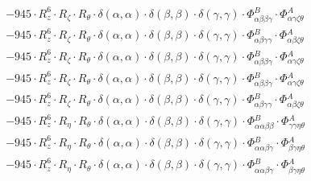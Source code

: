 \documentclass{article}
\begin{document}
\begin{subequations}
\begin{gather}
\begin{array}{c}
 \\[0.2em] 		 - 945 \cdot R_{z}^{6} \cdot R_{\zeta{}} \cdot R_{\theta{}} \cdot \delta{}\left(\alpha{}, \alpha{}\right) \cdot \delta{}\left(\beta{}, \beta{}\right) \cdot \delta{}\left(\gamma{}, \gamma{}\right) \cdot \Phi{}^{B}_{\alpha{}\beta{}\beta{}\gamma{}} \cdot \Phi{}^{A}_{\alpha{}\gamma{}\zeta{}\theta{}} 
 \\[0.2em] 		 - 945 \cdot R_{z}^{6} \cdot R_{\zeta{}} \cdot R_{\theta{}} \cdot \delta{}\left(\alpha{}, \alpha{}\right) \cdot \delta{}\left(\beta{}, \beta{}\right) \cdot \delta{}\left(\gamma{}, \gamma{}\right) \cdot \Phi{}^{B}_{\alpha{}\beta{}\gamma{}\gamma{}} \cdot \Phi{}^{A}_{\alpha{}\beta{}\zeta{}\theta{}} 
 \\[0.2em] 		 - 945 \cdot R_{z}^{6} \cdot R_{\zeta{}} \cdot R_{\theta{}} \cdot \delta{}\left(\alpha{}, \alpha{}\right) \cdot \delta{}\left(\beta{}, \beta{}\right) \cdot \delta{}\left(\gamma{}, \gamma{}\right) \cdot \Phi{}^{B}_{\alpha{}\beta{}\beta{}\gamma{}} \cdot \Phi{}^{A}_{\alpha{}\gamma{}\zeta{}\theta{}} 
 \\[0.2em] 		 - 945 \cdot R_{z}^{6} \cdot R_{\zeta{}} \cdot R_{\theta{}} \cdot \delta{}\left(\alpha{}, \alpha{}\right) \cdot \delta{}\left(\beta{}, \beta{}\right) \cdot \delta{}\left(\gamma{}, \gamma{}\right) \cdot \Phi{}^{B}_{\alpha{}\beta{}\beta{}\gamma{}} \cdot \Phi{}^{A}_{\alpha{}\gamma{}\zeta{}\theta{}} 
 \\[0.2em] 		 - 945 \cdot R_{z}^{6} \cdot R_{\zeta{}} \cdot R_{\theta{}} \cdot \delta{}\left(\alpha{}, \alpha{}\right) \cdot \delta{}\left(\beta{}, \beta{}\right) \cdot \delta{}\left(\gamma{}, \gamma{}\right) \cdot \Phi{}^{B}_{\alpha{}\beta{}\gamma{}\gamma{}} \cdot \Phi{}^{A}_{\alpha{}\beta{}\zeta{}\theta{}} 
 \\[0.2em] 		 - 945 \cdot R_{z}^{6} \cdot R_{\eta{}} \cdot R_{\theta{}} \cdot \delta{}\left(\alpha{}, \alpha{}\right) \cdot \delta{}\left(\beta{}, \beta{}\right) \cdot \delta{}\left(\gamma{}, \gamma{}\right) \cdot \Phi{}^{B}_{\alpha{}\alpha{}\beta{}\beta{}} \cdot \Phi{}^{A}_{\gamma{}\gamma{}\eta{}\theta{}} 
 \\[0.2em] 		 - 945 \cdot R_{z}^{6} \cdot R_{\eta{}} \cdot R_{\theta{}} \cdot \delta{}\left(\alpha{}, \alpha{}\right) \cdot \delta{}\left(\beta{}, \beta{}\right) \cdot \delta{}\left(\gamma{}, \gamma{}\right) \cdot \Phi{}^{B}_{\alpha{}\alpha{}\beta{}\gamma{}} \cdot \Phi{}^{A}_{\beta{}\gamma{}\eta{}\theta{}} 
 \\[0.2em] 		 - 945 \cdot R_{z}^{6} \cdot R_{\eta{}} \cdot R_{\theta{}} \cdot \delta{}\left(\alpha{}, \alpha{}\right) \cdot \delta{}\left(\beta{}, \beta{}\right) \cdot \delta{}\left(\gamma{}, \gamma{}\right) \cdot \Phi{}^{B}_{\alpha{}\alpha{}\beta{}\gamma{}} \cdot \Phi{}^{A}_{\beta{}\gamma{}\eta{}\theta{}} 

\end{array}
\end{gather}
\end{subequations}
\end{document}
